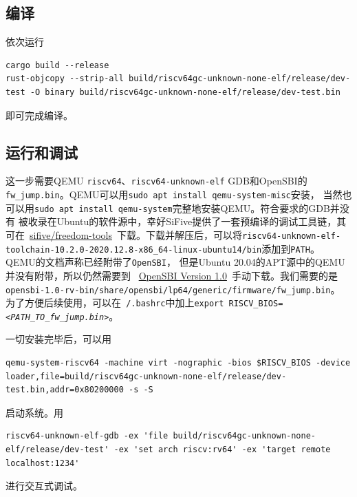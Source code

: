 \documentclass{../runikraft-report}
\begin{document}
\subsection{编译}
依次运行
\begin{lstlisting}
cargo build --release
rust-objcopy --strip-all build/riscv64gc-unknown-none-elf/release/dev-test -O binary build/riscv64gc-unknown-none-elf/release/dev-test.bin
\end{lstlisting}
即可完成编译。

\subsection{运行和调试}
这一步需要QEMU \texttt{riscv64}、\texttt{riscv64-unknown-elf} GDB和OpenSBI的
\texttt{fw\_jump.bin}。QEMU可以用\texttt{sudo apt install qemu-system-misc}安装，
当然也可以用\texttt{sudo apt install qemu-system}完整地安装QEMU。符合要求的GDB并没有
被收录在Ubuntu的软件源中，幸好SiFive提供了一套预编译的调试工具链，其可在\
\href{https://github.com/sifive/freedom-tools/releases}{sifive/freedom-tools}\
下载。下载并解压后，可以将\texttt{riscv64-unknown-elf-toolchain-10.2.0-2020.12.8-x86\_64-linux-ubuntu14/bin}添加到\texttt{PATH}。
QEMU的文档声称已经附带了\texttt{OpenSBI}\cite{qemu-virt}，
但是Ubuntu 20.04的APT源中的QEMU并没有附带，所以仍然需要到
\ \href{https://github.com/riscv-software-src/opensbi/releases/tag/v1.0}{OpenSBI Version 1.0}\
手动下载。我们需要的是\linebreak\texttt{opensbi-1.0-rv-bin/share/opensbi/lp64/generic/firmware/fw\_jump.bin}。
为了方便后续使用，可以在\texttt{~/.bashrc}中加上\texttt{export RISCV\_BIOS=\textit{<PATH\_TO\_fw\_jump.bin>}}。

一切安装完毕后，可以用
\begin{lstlisting}
qemu-system-riscv64 -machine virt -nographic -bios $RISCV_BIOS -device loader,file=build/riscv64gc-unknown-none-elf/release/dev-test.bin,addr=0x80200000 -s -S
\end{lstlisting}
启动系统。用
\begin{lstlisting}
riscv64-unknown-elf-gdb -ex 'file build/riscv64gc-unknown-none-elf/release/dev-test' -ex 'set arch riscv:rv64' -ex 'target remote localhost:1234'
\end{lstlisting}
进行交互式调试。
\end{document}
